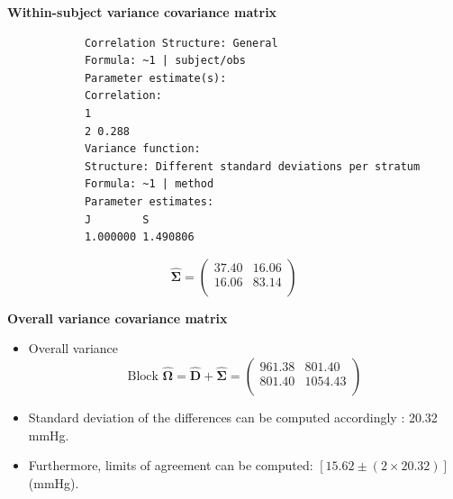 \documentclass[compress]{beamer}        %
\makeatletter
\newcommand{\tcb}{\textcolor{beamer@blendedblue}}
\makeatother
\begin{document}
		\begin{frame}[fragile]{\bf \tcb{Within-subject variance covariance matrix}}
			\begin{verbatim}
			Correlation Structure: General
			Formula: ~1 | subject/obs
			Parameter estimate(s):
			Correlation:
			1
			2 0.288
			Variance function:
			Structure: Different standard deviations per stratum
			Formula: ~1 | method
			Parameter estimates:
			J        S
			1.000000 1.490806
			\end{verbatim}
			\[
			\hat{\boldsymbol{\Sigma}} = \left(
			\begin{array}{cc}
			37.40 & 16.06 \\
			16.06 & 83.14 \\
			\end{array}\right)
			\]
		\end{frame}
		\begin{frame}[fragile]{\bf \tcb{Overall variance covariance matrix}}
			
			\begin{itemize}\itemsep0.7cm
				\item Overall variance \[
				\mbox{Block }\hat{\boldsymbol{\Omega}} = \hat{\boldsymbol{D}} + \hat{\boldsymbol{\Sigma}} =
				\left(
				\begin{array}{cc}
				961.38 & 801.40 \\
				801.40 & 1054.43 \\
				\end{array}
				\right)
				\]
				
				\item Standard deviation of the differences can be computed accordingly : 20.32 mmHg.
				
				\item Furthermore, limits of agreement can be computed: $[15.62 \pm (2 \times 20.32) ]$ (mmHg).
			\end{itemize}
		\end{frame}
		
		
\end{document}

